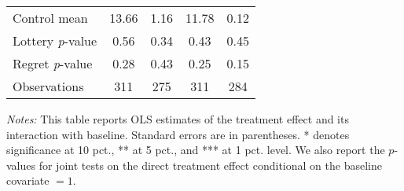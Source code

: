 \begin{table}[htbp]
{\begin{threeparttable}
\begin{tabular}{l*{4}{c}}
Control mean    &    13.66         &     1.16         &    11.78         &     0.12         \\
Lottery \emph{p}-value&     0.56         &     0.34         &     0.43         &     0.45         \\
Regret \emph{p}-value&     0.28         &     0.43         &     0.25         &     0.15         \\
Observations    &      311         &      275         &      311         &      284         \\
\bottomrule \end{tabular} \begin{tablenotes}[flushleft] \footnotesize \item \emph{Notes:} This table reports OLS estimates of the treatment effect and its interaction with baseline. Standard errors are in parentheses. * denotes significance at 10 pct., ** at 5 pct., and *** at 1 pct. level. We also report the \(p\)-values for joint tests on the direct treatment effect conditional on the baseline covariate $= 1$. \end{tablenotes} \end{threeparttable} } \end{table}

